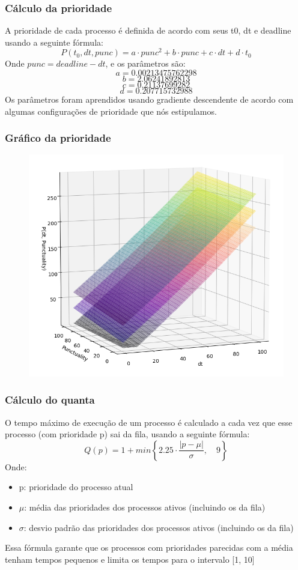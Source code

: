 \documentclass{beamer}
\begin{document}
\begin{frame}
\frametitle{C\'alculo da prioridade}
A prioridade de cada processo é definida de acordo com seus t0, dt e deadline usando a seguinte fórmula:
$$P(t_0, dt, punc) = a\cdot punc^2 + b\cdot punc + c\cdot dt + d\cdot t_0$$
Onde $punc = deadline - dt$, e os parâmetros são:
$$a=0.00213475762298$$
$$b=2.06241892813$$
$$c=0.21137699282$$
$$d=0.207715732988$$
Os parâmetros foram aprendidos usando gradiente descendente de acordo com algumas configurações de prioridade que nós estipulamos.
\end{frame}

\begin{frame}
\frametitle{Gráfico da prioridade}
\begin{figure}
\includegraphics[width=0.8\linewidth]{pfunction.png}
\end{figure}
\end{frame}

\begin{frame}
\frametitle{Cálculo do quanta}
O tempo máximo de execução de um processo é calculado a cada vez que esse processo (com prioridade p) sai da fila, usando a seguinte fórmula:
$$Q(p) = 1 + min\left\{2.25\cdot\frac{|p-\mu|}{\sigma},\quad 9\right\}$$
Onde:
\begin{itemize}
\item p: prioridade do processo atual
\item $\mu$: média das prioridades dos processos ativos (incluindo os da fila)
\item $\sigma$: desvio padrão das prioridades dos processos ativos (incluindo os da fila)
\end{itemize}
Essa fórmula garante que os processos com prioridades parecidas com a média tenham tempos pequenos e limita os tempos para o intervalo [1, 10]
\end{frame}
\end{document}
